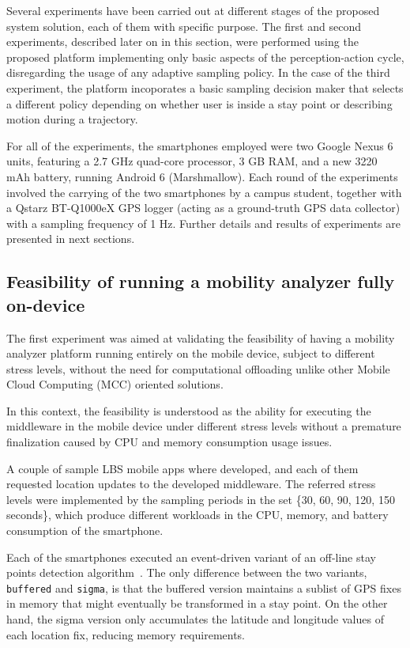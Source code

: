 \documentclass[ENG,PhD]{cinvestav}
\begin{document}
Several experiments have been carried out at different stages of the proposed system solution, each of them with specific purpose.
The first and second experiments, described later on in this section, were performed using the proposed platform implementing only basic aspects of the perception-action cycle, disregarding the usage of any adaptive sampling policy.
In the case of the third experiment, the platform incoporates a basic sampling decision maker that selects a different policy depending on whether user is inside a stay point or describing motion during a trajectory.

For all of the experiments, the smartphones employed were two Google Nexus 6 units, featuring a 2.7 GHz quad-core processor, 3 GB RAM, and a new 3220 mAh battery, running Android 6 (Marshmallow).
Each round of the experiments involved the carrying of the two smartphones by a campus student, together with a Qstarz BT-Q1000eX GPS logger (acting as a ground-truth GPS data collector) with a sampling frequency of 1 Hz.
Further details and results of experiments are presented in next sections.


\subsection{Feasibility of running a mobility analyzer fully on-device}
The first experiment was aimed at validating the feasibility of having a mobility analyzer platform running entirely on the mobile device, subject to different stress levels, without the need for computational offloading unlike other Mobile Cloud Computing (MCC) oriented solutions\cite{Perez-Torres2016b}.

In this context, the feasibility is understood as the ability for executing the middleware in the mobile device under different stress levels without a premature finalization caused by CPU and memory consumption usage issues.

A couple of sample LBS mobile apps where developed, and each of them requested location updates to the developed middleware.
The referred stress levels were implemented by the sampling periods in the set \{30, 60, 90, 120, 150 seconds\}, which produce different workloads in the CPU, memory, and battery consumption of the smartphone.

Each of the smartphones executed an event-driven variant of an off-line stay points detection algorithm~\cite{Li2008,Ye2009,Perez-Torres2016b}.
The only difference between the two variants, \texttt{buffered} and \texttt{sigma}, is that the buffered version maintains a sublist of GPS fixes in memory that might eventually be transformed in a stay point.
On the other hand, the sigma version only accumulates the latitude and longitude values of each location fix, reducing memory requirements.
\end{document}
